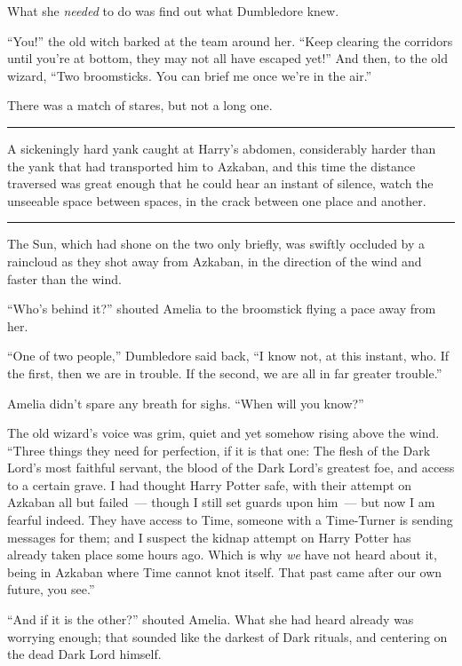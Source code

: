 What she \emph{needed} to do was find out what Dumbledore knew.

``You!'' the old witch barked at the team around her. ``Keep clearing the corridors until you're at bottom, they may not all have escaped yet!'' And then, to the old wizard, ``Two broomsticks. You can brief me once we're in the air.''

There was a match of stares, but not a long one.

\begin{center}\rule{3in}{0.4pt}\end{center}

A sickeningly hard yank caught at Harry's abdomen, considerably harder than the yank that had transported him to Azkaban, and this time the distance traversed was great enough that he could hear an instant of silence, watch the unseeable space between spaces, in the crack between one place and another.

\begin{center}\rule{3in}{0.4pt}\end{center}

The Sun, which had shone on the two only briefly, was swiftly occluded by a raincloud as they shot away from Azkaban, in the direction of the wind and faster than the wind.

``Who's behind it?'' shouted Amelia to the broomstick flying a pace away from her.

``One of two people,'' Dumbledore said back, ``I know not, at this instant, who. If the first, then we are in trouble. If the second, we are all in far greater trouble.''

Amelia didn't spare any breath for sighs. ``When will you know?''

The old wizard's voice was grim, quiet and yet somehow rising above the wind. ``Three things they need for perfection, if it is that one: The flesh of the Dark Lord's most faithful servant, the blood of the Dark Lord's greatest foe, and access to a certain grave. I had thought Harry Potter safe, with their attempt on Azkaban all but failed~--- though I still set guards upon him~--- but now I am fearful indeed. They have access to Time, someone with a Time-Turner is sending messages for them; and I suspect the kidnap attempt on Harry Potter has already taken place some hours ago. Which is why \emph{we} have not heard about it, being in Azkaban where Time cannot knot itself. That past came after our own future, you see.''

``And if it is the other?'' shouted Amelia. What she had heard already was worrying enough; that sounded like the darkest of Dark rituals, and centering on the dead Dark Lord himself.

